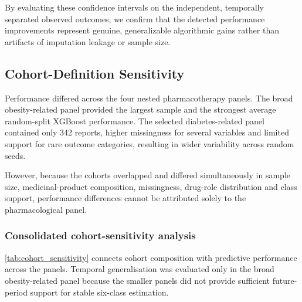 \documentclass[10pt]{article}
\begin{document}
By evaluating these confidence intervals on the independent, temporally separated observed outcomes, we confirm that the detected performance improvements represent genuine, generalizable algorithmic gains rather than artifacts of imputation leakage or sample size.
 
\subsection{Cohort-Definition Sensitivity}
Performance differed across the four nested pharmacotherapy panels. The broad obesity-related panel provided the largest sample and the strongest average random-split XGBoost performance. The selected diabetes-related panel contained only 342 reports, higher missingness for several variables and limited support for rare outcome categories, resulting in wider variability across random seeds.

However, because the cohorts overlapped and differed simultaneously in sample size, medicinal-product composition, missingness, drug-role distribution and class support, performance differences cannot be attributed solely to the pharmacological panel.

\subsubsection{Consolidated cohort-sensitivity analysis}
\cref{tab:cohort_sensitivity} connects cohort composition with predictive performance across the panels. Temporal generalisation was evaluated only in the broad obesity-related panel because the smaller panels did not provide sufficient future-period support for stable six-class estimation.
\end{document}
